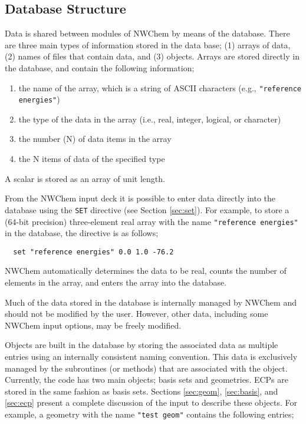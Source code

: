 \subsection{Database Structure}
\label{sec:database}

Data is shared between modules of NWChem by means of the database.  There
are three main types of information stored in the data base; (1) arrays of
data, (2) names of files that contain data, and (3) objects.  
Arrays are stored directly in the database, and contain the following
information;
\begin{enumerate}
\item the name of the array, which is a string of ASCII characters (e.g., 
      \verb+"reference energies"+)
\item the type of the data in the array 
(i.e., real, integer, logical, or character) 
\item the number (N) of data items in the array
\item the N items of data of the specified type
\end{enumerate}
A scalar is stored as an array of unit length.

From the NWChem input deck it is possible to enter data directly into
the database using the \verb+SET+ directive (see Section
\ref{sec:set}).  For example, to store a (64-bit precision)
three-element real array with the name \verb+"reference energies"+ in
the database, the directive is as follows;
\begin{verbatim}
  set "reference energies" 0.0 1.0 -76.2
\end{verbatim}
NWChem automatically determines the data to be real, counts the number
of elements in the array, and enters the array into the database.

Much of the data stored in the database is internally managed by
NWChem and should not be modified by the user.  However, other data,
including some NWChem input options, may be freely modified.  

Objects are built in the database by storing the associated data as
multiple entries using an internally consistent naming convention.
This data is exclusively managed by the subroutines (or methods) that
are associated with the object.  Currently, the code has two main
objects; basis sets and geometries.  ECPs are stored in the same
fashion as basis sets.  Sections \ref{sec:geom}, \ref{sec:basis}, and
\ref{sec:ecp} present a complete discussion of the input to describe
these objects.  For example, a geometry with the name
\verb+"test geom"+ contains the following entries;

